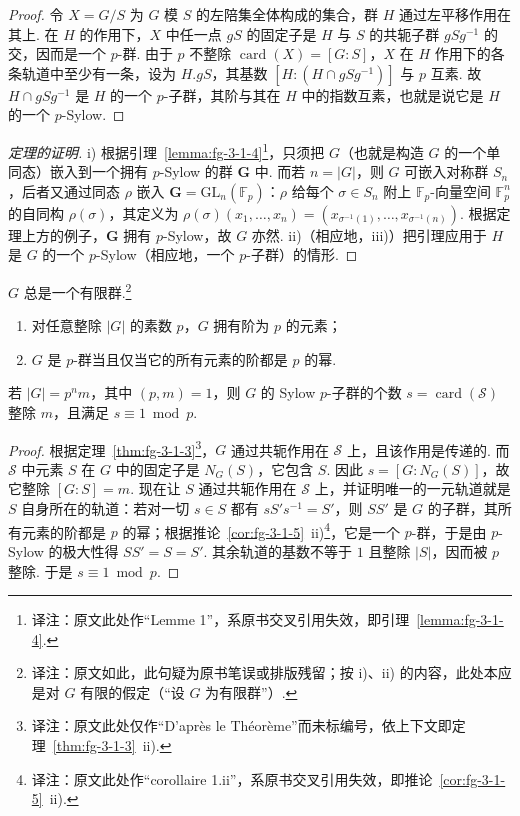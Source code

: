 \begin{proof}
令 $X=G/S$ 为 $G$ 模 $S$ 的左陪集全体构成的集合，群 $H$ 通过左平移作用在其上. 在 $H$ 的作用下，$X$ 中任一点 $gS$ 的固定子是 $H$ 与 $S$ 的共轭子群 $gSg^{-1}$ 的交，因而是一个 $p$-群. 由于 $p$ 不整除 $\operatorname{card}(X)=[G:S]$，$X$ 在 $H$ 作用下的各条轨道中至少有一条，设为 $H.gS$，其基数 $[H:(H\cap gSg^{-1})]$ 与 $p$ 互素. 故 $H\cap gSg^{-1}$ 是 $H$ 的一个 $p$-子群，其阶与其在 $H$ 中的指数互素，也就是说它是 $H$ 的一个 $p$-Sylow.
\end{proof}

\begin{proof}[定理的证明]
i) 根据引理~\ref{lemma:fg-3-1-4}\footnote{译注：原文此处作``Lemme 1''，系原书交叉引用失效，即引理~\ref{lemma:fg-3-1-4}.}，只须把 $G$（也就是构造 $G$ 的一个单同态）嵌入到一个拥有 $p$-Sylow 的群 $\mathbf{G}$ 中. 而若 $n=|G|$，则 $G$ 可嵌入对称群 $S_n$，后者又通过同态 $\rho$ 嵌入 $\mathbf{G}=\mathrm{GL}_n(\mathbb{F}_p)$：$\rho$ 给每个 $\sigma\in S_n$ 附上 $\mathbb{F}_p$-向量空间 $\mathbb{F}_p^n$ 的自同构 $\rho(\sigma)$，其定义为 $\rho(\sigma)(x_1,\dots,x_n)=(x_{\sigma^{-1}(1)},\dots,x_{\sigma^{-1}(n)})$. 根据定理上方的例子，$\mathbf{G}$ 拥有 $p$-Sylow，故 $G$ 亦然.
ii)（相应地，iii)）把引理应用于 $H$ 是 $G$ 的一个 $p$-Sylow（相应地，一个 $p$-子群）的情形.
\end{proof}

\begin{corollary}\label{cor:fg-3-1-5}
$G$ 总是一个有限群.\footnote{译注：原文如此，此句疑为原书笔误或排版残留；按 i)、ii) 的内容，此处本应是对 $G$ 有限的假定（``设 $G$ 为有限群''）.}
\begin{enumerate}[label=\roman*)]
\item 对任意整除 $|G|$ 的素数 $p$，$G$ 拥有阶为 $p$ 的元素；
\item $G$ 是 $p$-群当且仅当它的所有元素的阶都是 $p$ 的幂.
\end{enumerate}
\end{corollary}

\begin{proposition}\label{prop:fg-3-1-6}
若 $|G|=p^nm$，其中 $(p,m)=1$，则 $G$ 的 Sylow $p$-子群的个数 $s=\operatorname{card}(\mathcal{S})$ 整除 $m$，且满足 $s\equiv1\bmod p$.
\end{proposition}

\begin{proof}
根据定理~\ref{thm:fg-3-1-3}\footnote{译注：原文此处仅作``D'après le Théorème''而未标编号，依上下文即定理~\ref{thm:fg-3-1-3}~ii).}，$G$ 通过共轭作用在 $\mathcal{S}$ 上，且该作用是传递的. 而 $\mathcal{S}$ 中元素 $S$ 在 $G$ 中的固定子是 $N_G(S)$，它包含 $S$. 因此 $s=[G:N_G(S)]$，故它整除 $[G:S]=m$. 现在让 $S$ 通过共轭作用在 $\mathcal{S}$ 上，并证明唯一的一元轨道就是 $S$ 自身所在的轨道：若对一切 $s\in S$ 都有 $sS's^{-1}=S'$，则 $SS'$ 是 $G$ 的子群，其所有元素的阶都是 $p$ 的幂；根据推论~\ref{cor:fg-3-1-5}~ii)\footnote{译注：原文此处作``corollaire 1.ii''，系原书交叉引用失效，即推论~\ref{cor:fg-3-1-5}~ii).}，它是一个 $p$-群，于是由 $p$-Sylow 的极大性得 $SS'=S=S'$. 其余轨道的基数不等于 $1$ 且整除 $|S|$，因而被 $p$ 整除. 于是 $s\equiv1\bmod p$.
\end{proof}
